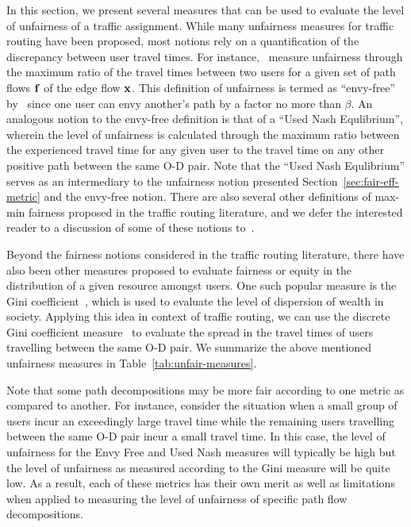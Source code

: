 \documentclass{article}
\begin{document}
In this section, we present several measures that can be used to evaluate the level of unfairness of a traffic assignment. While many unfairness measures for traffic routing have been proposed, most notions rely on a quantification of the discrepancy between user travel times. For instance,~\citet{correa-fair} measure unfairness through the maximum ratio of the travel times between two users for a given set of path flows $\mathbf{f}$ of the edge flow $\mathbf{x}$. This definition of unfairness is termed as ``envy-free'' by~\citet{basu2017reconciling} since one user can envy another's path by a factor no more than $\beta$. An analogous notion to the envy-free definition is that of a ``Used Nash Equlibrium'', wherein the level of unfairness is calculated through the maximum ratio between the experienced travel time for any given user to the travel time on any other positive path between the same O-D pair. Note that the ``Used Nash Equlibrium'' serves as an intermediary to the unfairness notion presented Section~\ref{sec:fair-eff-metric} and the envy-free notion. There are also several other definitions of max-min fairness proposed in the traffic routing literature, and we defer the interested reader to a discussion of some of these notions to~\citet{so-routing-seminal}.

Beyond the fairness notions considered in the traffic routing literature, there have also been other measures proposed to evaluate fairness or equity in the distribution of a given resource amongst users. One such popular measure is the Gini coefficient~\cite{gini-index}, which is used to evaluate the level of dispersion of wealth in society. Applying this idea in context of traffic routing, we can use the discrete Gini coefficient measure~\cite{WU20121273,jalota-cprr} to evaluate the spread in the travel times of users travelling between the same O-D pair. We summarize the above mentioned unfairness measures in Table~\ref{tab:unfair-measures}. 

Note that some path decompositions may be more fair according to one metric as compared to another. For instance, consider the situation when a small group of users incur an exceedingly large travel time while the remaining users travelling between the same O-D pair incur a small travel time. In this case, the level of unfairness for the Envy Free and Used Nash measures will typically be high but the level of unfairness as measured according to the Gini measure will be quite low. As a result, each of these metrics has their own merit as well as limitations when applied to measuring the level of unfairness of specific path flow decompositions.
\end{document}
